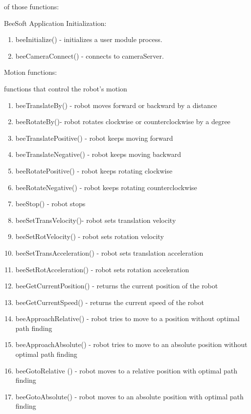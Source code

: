 of those functions:\par {\bf \par BeeSoft Application
  Initialization:\par \begin{enumerate}\item beeInitialize() -
  initializes a user module process. \item  beeCameraConnect() -
  connects to cameraServer.\end{enumerate}{\bf \par Motion
  functions: }functions that control the robot's motion\par
\begin{enumerate}\item beeTranslateBy() - robot moves forward or
  backward by a distance\item  beeRotateBy()- robot rotates
  clockwise or counterclockwise by a degree\item 
  beeTranslatePositive() - robot keeps moving forward \item 
  beeTranslateNegative() - robot keeps moving backward\item 
  beeRotatePositive() - robot keeps rotating clockwise\item 
  beeRotateNegative() - robot keeps rotating counterclockwise 
\item beeStop() - robot stops\item  beeSetTransVelocity()- robot
  sets translation velocity \item  beeSetRotVelocity() - robot
  sets rotation velocity\item  beeSetTransAcceleration() - robot
  sets translation acceleration\item  beeSetRotAcceleration() -
  robot sets rotation acceleration\item  beeGetCurrentPosition()
  - returns the current position of the robot\item 
  beeGetCurrentSpeed() - returns the current speed of the robot
\item beeApproachRelative() - robot tries to move to a position
  without optimal path finding \item  beeApproachAbsolute() -
  robot tries to move to an absolute position without optimal path
  finding\item  beeGotoRelative () - robot moves to a relative
  position with optimal path finding\item  beeGotoAbsolute() -
  robot moves to an absolute position with optimal path finding

\end{enumerate}}
